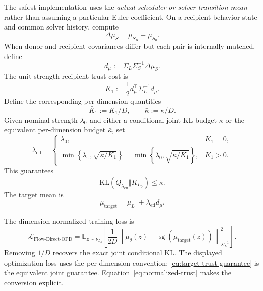 \documentclass[11pt,a4paper]{article}
\newcommand{\E}{\mathbb{E}}
\newcommand{\KL}{\mathrm{KL}}
\newcommand{\norm}[1]{\left\lVert #1 \right\rVert}
\newcommand{\sg}{\operatorname{sg}}
\newcommand{\Sbase}{S_0}
\newcommand{\Srl}{S_R}
\newcommand{\Lbase}{L_0}
\newcommand{\Lbeh}{L_{\bar\theta}}
\newcommand{\dmuS}{\Delta\mu_S}
\theoremstyle{plain}
\theoremstyle{definition}
\begin{document}
The safest implementation uses the \emph{actual scheduler or solver transition mean} rather than
assuming a particular Euler coefficient.  On a recipient behavior state and common solver
history, compute
\begin{equation}
\dmuS
=
\mu_{\Srl}-\mu_{\Sbase}.
\label{eq:actual-mean-shift}
\end{equation}
When donor and recipient covariances differ but each pair is internally matched, define
\begin{equation}
d_\mu
:=
\Sigma_L\Sigma_S^{-1}\dmuS.
\label{eq:preconditioned-shift}
\end{equation}
The unit-strength recipient trust cost is
\begin{equation}
K_1
:=
\frac12
d_\mu^\top\Sigma_L^{-1}d_\mu.
\label{eq:unit-trust-kl}
\end{equation}
Define the corresponding per-dimension quantities
\begin{equation}
\bar K_1:=K_1/D,
\qquad
\bar\kappa:=\kappa/D.
\label{eq:normalized-trust}
\end{equation}
Given nominal strength $\lambda_0$ and either a conditional joint-KL budget $\kappa$ or the
equivalent per-dimension budget $\bar\kappa$, set
\begin{equation}
\lambda_{\mathrm{eff}}
=
\begin{cases}
\lambda_0, & K_1=0,\\[0.3em]
\min\!\left\{
\lambda_0,\sqrt{\kappa/K_1}
\right\}
=
\min\!\left\{
\lambda_0,\sqrt{\bar\kappa/\bar K_1}
\right\},
& K_1>0.
\end{cases}
\label{eq:lambda-clipping}
\end{equation}
This guarantees
\begin{equation}
\KL(Q_{\lambda_{\mathrm{eff}}}\Vert K_{\Lbase})
\le\kappa .
\label{eq:target-trust-guarantee}
\end{equation}
The target mean is
\begin{equation}
\mu_{\mathrm{target}}
=
\mu_{\Lbase}
+\lambda_{\mathrm{eff}}d_\mu.
\label{eq:main-target-mean}
\end{equation}

The dimension-normalized training loss is
\begin{equation}
\boxed{
\mathcal L_{\mathrm{Flow\text{-}Direct\text{-}OPD}}
=
\E_{z\sim\nu_{\Lbeh}}
\left[
\frac{1}{2D}
\norm{
\mu_\theta(z)
-\sg(\mu_{\mathrm{target}}(z))
}_{\Sigma_L^{-1}}^2
\right].
}
\label{eq:main-training-loss}
\end{equation}
Removing $1/D$ recovers the exact joint conditional KL.  The displayed optimization loss uses the
per-dimension convention; \eqref{eq:target-trust-guarantee} is the equivalent joint guarantee.
Equation~\eqref{eq:normalized-trust} makes the conversion explicit.
\end{document}
